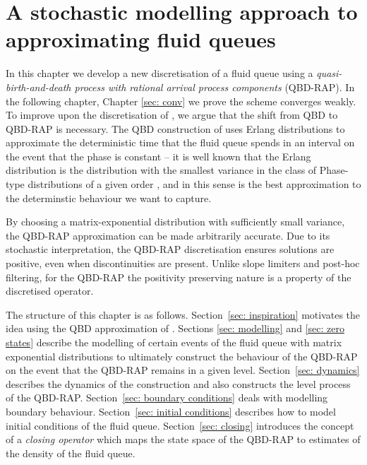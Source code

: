 \chapter{A stochastic modelling approach to approximating fluid queues\label{sec: construction and modelling}}
In this chapter we develop a new discretisation of a fluid queue using a \emph{quasi-birth-and-death process with rational arrival process components} (QBD-RAP). In the following chapter, Chapter \ref{sec: conv} we prove the scheme converges weakly. To improve upon the discretisation of \cite{bo2013}, we argue that the shift from QBD to QBD-RAP is necessary. The QBD construction of \cite{bo2013} uses Erlang distributions to approximate the deterministic time that the fluid queue spends in an interval on the event that the phase is constant -- it is well known that the Erlang distribution is the distribution with the smallest variance in the class of Phase-type distributions of a given order \cite{as1987}, and in this sense is the best approximation to the determinstic behaviour we want to capture. 

By choosing a matrix-exponential distribution with sufficiently small variance, the QBD-RAP approximation can be made arbitrarily accurate. Due to its stochastic interpretation, the QBD-RAP discretisation ensures solutions are positive, even when discontinuities are present. Unlike slope limiters and post-hoc filtering, for the QBD-RAP the positivity preserving nature is a property of the discretised operator. 

The structure of this chapter is as follows. Section~\ref{sec: inspiration} motivates the idea using the QBD approximation of \cite{bo2014}. Sections \ref{sec: modelling} and \ref{sec: zero states} describe the modelling of certain events of the fluid queue with matrix exponential distributions to ultimately construct the behaviour of the QBD-RAP on the event that the QBD-RAP remains in a given level. Section~\ref{sec: dynamics} describes the dynamics of the construction and also constructs the level process of the QBD-RAP. Section~\ref{sec: boundary conditions} deals with modelling boundary behaviour. Section~\ref{sec: initial conditions} describes how to model initial conditions of the fluid queue. Section~\ref{sec: closing} introduces the concept of a \emph{closing operator} which maps the state space of the QBD-RAP to estimates of the density of the fluid queue. 


